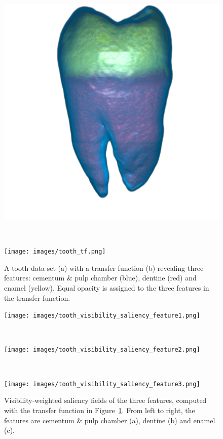 \begin{figure}
	\centering
	\begin{minipage}{.6\textwidth}
		\includegraphics[width=1\linewidth]{images/tooth_naive.png}
		\subcaption{}
	\end{minipage}~
	\begin{minipage}{.3\textwidth}
		\texttt{[image: images/tooth\_tf.png]}
		\subcaption{}
	\end{minipage}
	\caption[A tooth data set with a transfer function revealing three features]{A tooth data set (a) with a transfer function (b) revealing three features: cementum \& pulp chamber (blue), dentine (red) and enamel (yellow). Equal opacity is assigned to the three features in the transfer function.}
	\label{fig:tooth}
\end{figure}

\begin{figure}
	\centering
	\begin{minipage}{.3\textwidth}
		\texttt{[image: images/tooth\_visibility\_saliency\_feature1.png]}
		\subcaption{}
	\end{minipage}~
	\begin{minipage}{.3\textwidth}
		\texttt{[image: images/tooth\_visibility\_saliency\_feature2.png]}
		\subcaption{}
	\end{minipage}~
	\begin{minipage}{.3\textwidth}
		\texttt{[image: images/tooth\_visibility\_saliency\_feature3.png]}
		\subcaption{}
	\end{minipage}
	\caption[Visibility-weighted saliency fields of the three features]{Visibility-weighted saliency fields of the three features, computed with the transfer function in Figure~\ref{fig:tooth}. From left to right, the features are cementum \& pulp chamber (a), dentine (b) and enamel (c).}
	\label{fig:tooth_saliency_field}
\end{figure}

